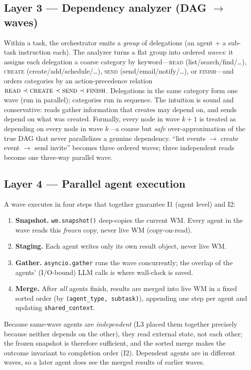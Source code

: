 \documentclass[10pt,twocolumn]{article}
\newcommand{\code}[1]{\texttt{\small #1}}
\begin{document}
\subsection{Layer 3 --- Dependency analyzer (DAG $\to$ waves)}
Within a task, the orchestrator emits a \emph{group} of delegations (an agent + a
sub-task instruction each). The analyzer turns a flat group into ordered
\emph{waves}: it assigns each delegation a coarse category by keyword---\textsc{read}
(list/search/find/\ldots), \textsc{create} (create/add/schedule/\ldots),
\textsc{send} (send/email/notify/\ldots), or \textsc{finish}---and orders
categories by an action-precedence relation
$\textsc{read}\prec\textsc{create}\prec\textsc{send}\prec\textsc{finish}$.
Delegations in the same category form one wave (run in parallel); categories run
in sequence. The intuition is sound and conservative: reads gather information
that creates may depend on, and sends depend on what was created. Formally, every
node in wave $k{+}1$ is treated as depending on every node in wave $k$---a coarse
but \emph{safe} over-approximation of the true DAG that never parallelizes a
genuine dependency. ``list events $\to$ create event $\to$ send invite'' becomes
three ordered waves; three independent reads become one three-way parallel wave.

\subsection{Layer 4 --- Parallel agent execution}
A wave executes in four steps that together guarantee \textsc{I1} (agent level)
and \textsc{I2}:
\begin{enumerate}\itemsep0pt
\item \textbf{Snapshot.} \code{wm.snapshot()} deep-copies the current WM. Every
agent in the wave reads this \emph{frozen} copy, never live WM (copy-on-read).
\item \textbf{Staging.} Each agent writes only its own result object, never live
WM.
\item \textbf{Gather.} \code{asyncio.gather} runs the wave concurrently; the
overlap of the agents' (I/O-bound) LLM calls is where wall-clock is saved.
\item \textbf{Merge.} After \emph{all} agents finish, results are merged into live
WM in a fixed sorted order (by \code{(agent\_type, subtask)}), appending one step
per agent and updating \code{shared\_context}.
\end{enumerate}
Because same-wave agents are \emph{independent} (L3 placed them together precisely
because neither depends on the other), they read external state, not each other;
the frozen snapshot is therefore sufficient, and the sorted merge makes the
outcome invariant to completion order (\textsc{I2}). Dependent agents are in
different waves, so a later agent does see the merged results of earlier waves.
\end{document}
